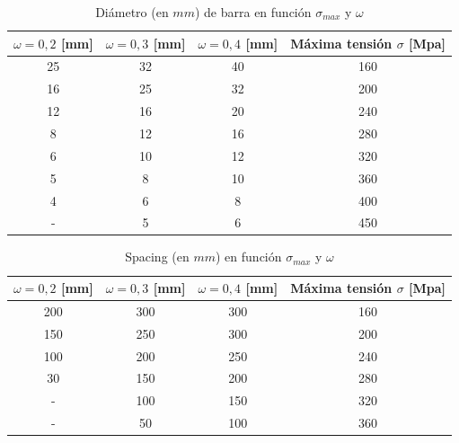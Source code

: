 \documentclass[landscape]{article}
\begin{document}
\begin{multicols*}{2}
\begin{table}[H]
  \centering
  \begin{tabular}{cccc}
    \toprule
      $\omega = 0,2$ [mm] & $\omega = 0,3$ [mm] & $\omega = 0,4$ [mm] & Máxima tensión $\sigma$ [Mpa]\tabularnewline
    \midrule
      25 & 32 & 40 & 160\tabularnewline
      16 & 25 & 32 & 200\tabularnewline
      12 & 16 & 20 & 240\tabularnewline
      8 & 12 & 16 & 280\tabularnewline
      6 & 10 & 12 & 320\tabularnewline
      5 & 8 & 10 & 360\tabularnewline
      4 & 6 & 8 & 400\tabularnewline
      - & 5 & 6 & 450\tabularnewline
    \bottomrule
  \end{tabular}
  \caption{Diámetro (en $mm$) de barra en función $\sigma_{max}$ y $\omega$}
  \label{tab:tension_grieta}
\end{table}

\begin{table}[H]
  \centering
  \begin{tabular}{cccc}
    \toprule
      $\omega = 0,2$ [mm] & $\omega = 0,3$ [mm] & $\omega = 0,4$ [mm] & Máxima tensión $\sigma$ [Mpa]\tabularnewline
    \midrule
      200 & 300 & 300 & 160\tabularnewline 
      150 & 250 & 300& 200\tabularnewline  
      100 & 200 & 250 & 240\tabularnewline
      30 & 150 & 200 & 280\tabularnewline
      - & 100 & 150 & 320\tabularnewline
      - & 50 & 100 & 360\tabularnewline
    \bottomrule
  \end{tabular}
  \caption{Spacing (en $mm$) en función $\sigma_{max}$ y $\omega$}
  \label{tab:spacing_grieta}
\end{table}


\end{multicols*}
\end{document}
